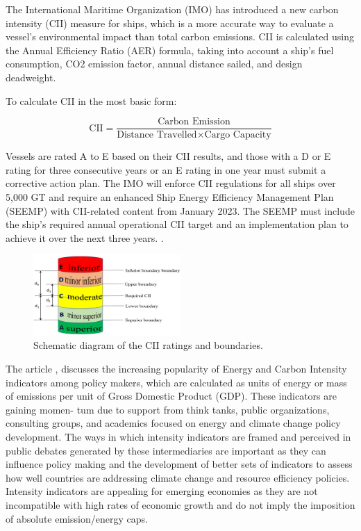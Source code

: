 The International Maritime Organization (IMO) has introduced a new carbon intensity (CII) measure for ships, which is a more accurate way to evaluate a vessel's environmental impact than total carbon emissions.
CII is calculated using the Annual Efficiency Ratio (AER) formula, taking into account a ship's fuel consumption, CO2 emission factor, annual distance sailed, and design deadweight.

To calculate CII in the most basic form:

\begin{equation}
    \text{CII} = \frac{\text{Carbon Emission}}{\text{Distance Travelled} \times \text{Cargo Capacity}}
    \label{eq:cii}
\end{equation}


Vessels are rated A to E based on their CII results, and those with a D or E rating for three consecutive years or an E rating in one year must submit a corrective action plan.
The IMO will enforce CII regulations for all ships over 5,000 GT and require an enhanced Ship Energy Efficiency Management Plan (SEEMP) with CII-related content from January 2023.
The SEEMP must include the ship's required annual operational CII target and an implementation plan to achieve it over the next three years. \autocite{chuah2023implementation}.

\begin{figure}[h]
    \centering
    \includegraphics[width=0.5\textwidth]{images/cii_ratings.jpeg}
    \caption{Schematic diagram of the CII ratings and boundaries. \autocite{tsai2023effects}}
    \label{ciiRating}
\end{figure}


The article \cite{rodriguez2020indicators}, discusses the increasing popularity of Energy and Carbon Intensity indicators among policy makers, which are calculated as units of energy or mass of emissions per unit of Gross Domestic Product (GDP).
These indicators are gaining momen- tum due to support from think tanks, public organizations, consulting groups, and academics focused on energy and climate change policy development.
The ways in which intensity indicators are framed and perceived in public debates generated by these intermediaries are important as they can influence policy making and the development of better sets of indicators to assess how well countries are addressing climate change and resource efficiency policies.
Intensity indicators are appealing for emerging economies as they are not incompatible with high rates of economic growth and do not imply the imposition of absolute emission/energy caps.


